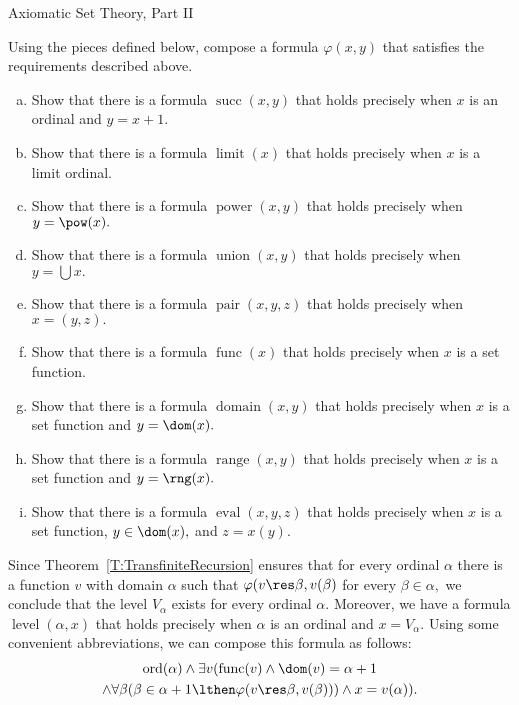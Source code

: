 \begin{unit}{Axiomatic Set Theory, Part II}
\begin{problem}
  Using the pieces defined below, compose a formula \(\varphi(x,y)\) that satisfies the requirements described above.
  \begin{enumerate}[(a)]
  \item Show that there is a formula \(\operatorname{succ}(x,y)\) that holds precisely when \(x\) is an ordinal and \(y = x+1.\)
  \item Show that there is a formula \(\operatorname{limit}(x)\) that holds precisely when \(x\) is a limit ordinal.
  \item Show that there is a formula \(\operatorname{power}(x,y)\) that holds precisely when \(y = \pow(x).\)
  \item Show that there is a formula \(\operatorname{union}(x,y)\) that holds precisely when \(y = \bigcup x.\)
  \item Show that there is a formula \(\operatorname{pair}(x,y,z)\) that holds precisely when \(x = (y,z).\)
  \item Show that there is a formula \(\operatorname{func}(x)\) that holds precisely when \(x\) is a set function.
  \item Show that there is a formula \(\operatorname{domain}(x,y)\) that holds precisely when \(x\) is a set function and \(y = \dom(x).\)
  \item Show that there is a formula \(\operatorname{range}(x,y)\) that holds precisely when \(x\) is a set function and \(y = \rng(x).\)
  \item Show that there is a formula \(\operatorname{eval}(x,y,z)\) that holds precisely when \(x\) is a set function, \(y \in \dom(x),\) and \(z = x(y).\)
  \end{enumerate}
\end{problem}

Since Theorem~\ref{T:TransfiniteRecursion} ensures that for every ordinal \(\alpha\) there is a function \(v\) with domain \(\alpha\) such that \(\varphi(v \res \beta, v(\beta)\) for every \(\beta \in \alpha,\) we conclude that the level \(V_\alpha\) exists for every ordinal \(\alpha.\)
Moreover, we have a formula \(\operatorname{level}(\alpha,x)\) that holds precisely when \(\alpha\) is an ordinal and \(x = V_\alpha.\) 
Using some convenient abbreviations, we can compose this formula as
follows: 
\begin{multline}
  \operatorname{ord}(\alpha) \land \exists v (\operatorname{func}(v)
  \land \dom(v) = \alpha+1\\\land \forall \beta(\beta \in \alpha+1
  \lthen \varphi(v \res \beta, v(\beta))) \land x = v(\alpha)).
\end{multline}


\end{unit}
